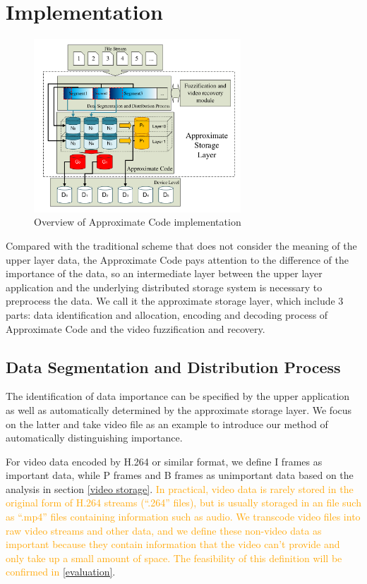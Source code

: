 \documentclass[sigconf]{acmart}
\begin{document}
\section{Implementation}\label{Implementation}
\begin{figure}[htb]
\centering
\includegraphics[height = 6.5cm]{photo/implementation-V2.pdf}
\caption{Overview of Approximate Code implementation}
\label{fig-implementation}
\end{figure}

Compared with the traditional scheme that does not consider the meaning of the upper layer data, the Approximate Code pays attention to the difference of the importance of the data, so an intermediate layer between the upper layer application and the underlying distributed storage system is necessary to preprocess the data. We call it the approximate storage layer, which include 3 parts: data identification and allocation, encoding and decoding process of Approximate Code and the video fuzzification and recovery.

\subsection{Data Segmentation and Distribution Process}
The identification of data importance can be specified by the upper application as well as automatically determined by the approximate storage layer. We focus on the latter and take video file as an example to introduce our method of automatically distinguishing importance.

For video data encoded by H.264 or similar format, we define I frames as important data, while P frames and B frames as unimportant data based on the analysis in section \ref{video storage}.
\textcolor{orange}{In practical, video data is rarely stored in the original form of H.264 streams (``.264'' files), but is usually storaged in an file such as ``.mp4'' files containing information such as audio. We transcode video files into raw video streams and other data, and we define these non-video data as important because they contain information that the video can't provide and only take up a small amount of space. The feasibility of this definition will be confirmed in} \ref{evaluation}.
\end{document}
